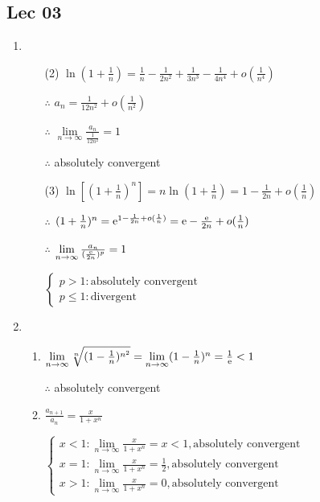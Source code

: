 \subsection{Lec 03}

 \begin{enumerate}[1]
   \item
   \begin{enumerate}[(1)]
     \item[(2)]
     $\ln (1+\frac{1}{n})=\frac{1}{n}-\frac{1}{2n^2}+\frac{1}{3n^3}-\frac{1}{4n^4}+o(\frac{1}{n^4})$
     \par $\therefore$ $a_n=\frac{1}{12n^2}+o(\frac{1}{n^2})$
     \par $\therefore$ $\lim\limits_{n\rightarrow{\infty}}\frac{a_n}{\frac{1}{12n^2}}=1$
     \par $\therefore$ absolutely convergent

     \item[(3)]
     $\ln [(1+\frac{1}{n})^n]=n \ln (1+\frac{1}{n})=1-\frac{1}{2n}+o(\frac{1}{n})$
     \par $\therefore$ $(1+\frac{1}{n})^n=\mathrm{e}^{1-\frac{1}{2n}+o(\frac{1}{n})}=\mathrm{e}-\frac{\mathrm{e}}{2n}+o(\frac{1}{n})$
     \par $\therefore$ $\lim\limits_{n\rightarrow{\infty}}\frac{a_n}{(\frac{\mathrm{e}}{2n})^p}=1$
     \par $ \begin{cases} p>1:\text{absolutely convergent}\\ p \leqslant 1:\text{divergent} \end{cases} $
   \end{enumerate}

   \item
   \begin{enumerate}[(1)]
     \item
     $\lim\limits_{n\rightarrow{\infty}}\sqrt[n]{(1-\frac{1}{n})^{n^2}}=\lim\limits_{n\rightarrow{\infty}}(1-\frac{1}{n})^n=\frac{1}{\mathrm{e}}<1$
     \par $\therefore$ absolutely convergent

     \item
     $\frac{a_{n+1}}{a_n}=\frac{x}{1+x^n}$
     \par $\begin{cases} x<1:\lim\limits_{n\rightarrow{\infty}}\frac{x}{1+x^n}=x<1,\text{absolutely convergent}
     \\x=1:\lim\limits_{n\rightarrow{\infty}}\frac{x}{1+x^n}=\frac{1}{2},\text{absolutely convergent}
     \\x>1:\lim\limits_{n\rightarrow{\infty}}\frac{x}{1+x^n}=0,\text{absolutely convergent} \end{cases}$
   \end{enumerate}


\end{enumerate}
